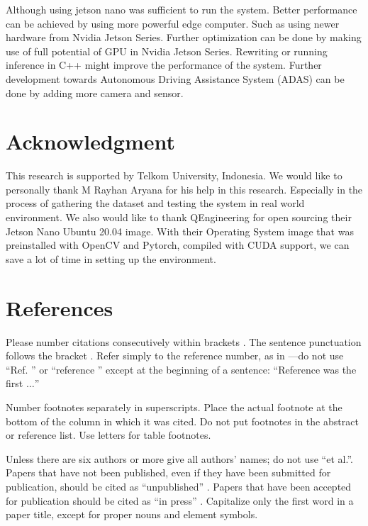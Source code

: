 \documentclass[conference]{IEEEtran}
\begin{document}
Although using jetson nano was sufficient to run the system. Better performance can be achieved by using more powerful edge computer. Such as using newer hardware from Nvidia Jetson Series. Further optimization can be done by making use of full potential of GPU in Nvidia Jetson Series. Rewriting or running inference in C++ might improve the performance of the system.
Further development towards Autonomous Driving Assistance System (ADAS) can be done by adding more camera and sensor.
\section*{Acknowledgment}
This research is supported by Telkom University, Indonesia.
We would like to personally thank M Rayhan Aryana for his help in this research.
Especially in the process of gathering the dataset and testing the system in real world environment.
We also would like to thank QEngineering for open sourcing their Jetson Nano Ubuntu 20.04 image. With their Operating System image that was preinstalled with OpenCV and Pytorch, compiled with CUDA support, we can save a lot of time in setting up the environment.


\section*{References}

Please number citations consecutively within brackets \cite{b1}. The 
sentence punctuation follows the bracket \cite{b2}. Refer simply to the reference 
number, as in \cite{b3}---do not use ``Ref. \cite{b3}'' or ``reference \cite{b3}'' except at 
the beginning of a sentence: ``Reference \cite{b3} was the first $\ldots$''

Number footnotes separately in superscripts. Place the actual footnote at 
the bottom of the column in which it was cited. Do not put footnotes in the 
abstract or reference list. Use letters for table footnotes.

Unless there are six authors or more give all authors' names; do not use 
``et al.''. Papers that have not been published, even if they have been 
submitted for publication, should be cited as ``unpublished'' \cite{b4}. Papers 
that have been accepted for publication should be cited as ``in press'' \cite{b5}. 
Capitalize only the first word in a paper title, except for proper nouns and 
element symbols.
\end{document}
